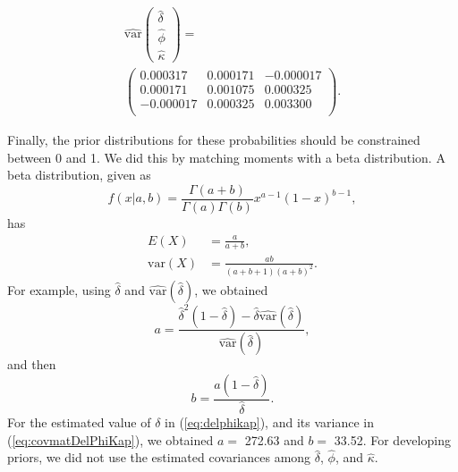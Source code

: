 \documentclass[]{risa}\usepackage[]{graphicx}\usepackage[]{color}
\def\var{\textrm{var}}
\begin{document}
\begin{equation} \label{eq:covmatDelPhiKap}
	\begin{array}{c}
  \hat{\var}\left(\begin{array}{c}
    \hat{\delta} \\
    \hat{\phi} \\
    \hat{\kappa}
  \end{array}\right) = \\
  \left(\begin{smallmatrix}
 0.000317 & 0.000171 & -0.000017 \\ 
  0.000171 & 0.001075 & 0.000325 \\ 
  -0.000017 & 0.000325 & 0.003300 \\ 
  \end{smallmatrix}\right).
  \end{array}
\end{equation}


Finally, the prior distributions for these probabilities should be constrained between 0 and 1.  We did this by matching moments with a beta distribution.  A beta distribution, given as
\[
f(x|a,b) = \frac{\Gamma(a + b)}{\Gamma(a)\Gamma(b)}x^{a-1}(1-x)^{b-1},
\]
has 
\begin{align}
E(X) &= \frac{a}{a + b}, \nonumber \\
\var(X) &= \frac{ab}{(a + b + 1)(a + b)^2}. \nonumber
\end{align}
For example, using $\hat{\delta}$ and $\hat{\var}(\hat{\delta})$, we obtained 
\[
a = \frac{\hat{\delta}^2(1-\hat{\delta}) - \hat{\delta}\hat{\var}(\hat{\delta})}
{\hat{\var}(\hat{\delta})},
\]
and then
\[
b = \frac{a(1 - \hat{\delta})}{\hat{\delta}}.
\]
For the estimated value of $\delta$ in (\ref{eq:delphikap}), and its variance in (\ref{eq:covmatDelPhiKap}), we obtained $a =$ 272.63 and $b =$ 33.52. For developing priors, we did not use the estimated covariances among $\hat{\delta}$, $\hat{\phi}$, and $\hat{\kappa}$.
\end{document}
